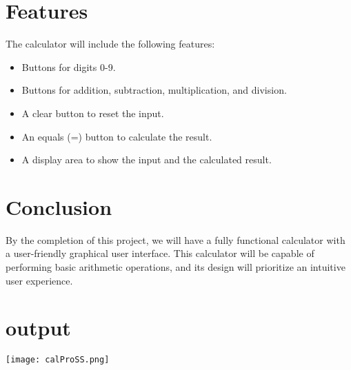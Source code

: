 \documentclass{article}
\begin{document}
\section{Features}
The calculator will include the following features:

\begin{itemize}
    \item Buttons for digits 0-9.
    \item Buttons for addition, subtraction, multiplication, and division.
    \item A clear button to reset the input.
    \item An equals (=) button to calculate the result.
    \item A display area to show the input and the calculated result.
\end{itemize}

\section{Conclusion}
By the completion of this project, we will have a fully functional calculator with a user-friendly graphical user interface. This calculator will be capable of performing basic arithmetic operations, and its design will prioritize an intuitive user experience.
\section{output}
\begin{left}
	\texttt{[image: calProSS.png]}
\end{left}
\end{document}
